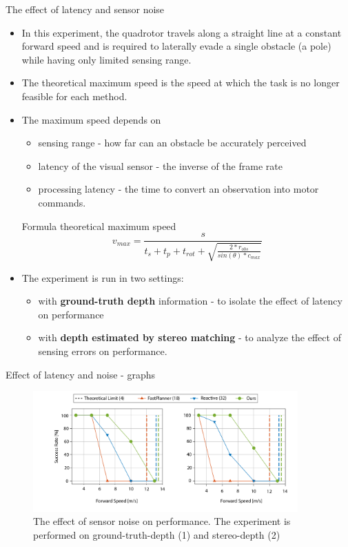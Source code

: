 \documentclass{beamer}
\begin{document}
\begin{frame}[allowframebreaks]{The effect of latency and sensor noise}
	\begin{itemize}
		\item In this experiment, the quadrotor travels along a straight line at a constant forward speed and is required to laterally evade a single obstacle (a pole) while having only limited sensing range.
		\item The theoretical maximum speed is the speed at which the task is no longer feasible for each method. 
		\item The maximum speed depends on 
		\begin{itemize}
			\item sensing range - how far can an obstacle be accurately perceived
			\item latency of the visual sensor - the inverse of the frame rate
			\item processing latency - the time to convert an observation into motor commands.
		\end{itemize} 
	
		\pagebreak
		
		\begin{block}{Formula}
			theoretical maximum speed
			\begin{equation}
				v_{max} = \frac{s}{t_s + t_p + t_{rot} + \sqrt{\frac{2*r_{obs}}{sin(\theta)*c_{max}}}}
			\end{equation}
		\end{block}
		\item The experiment is run in two settings:
		\begin{itemize}
			\item with \textbf{ground-truth depth} information - to isolate the effect of latency on performance
			\item with \textbf{depth estimated by stereo matching}\autocite{stereoMatching} - to analyze the effect of sensing errors on performance.
		\end{itemize}
	\end{itemize}
\end{frame}

\begin{frame}{Effect of latency and noise - graphs}
	\begin{figure}
		\includegraphics[width=4in]{images/noise-graph.png}
		\caption{The effect of sensor noise on performance. The experiment is performed on ground-truth-depth (1) and stereo-depth (2)}
	\end{figure}
\end{frame}
\end{document}
